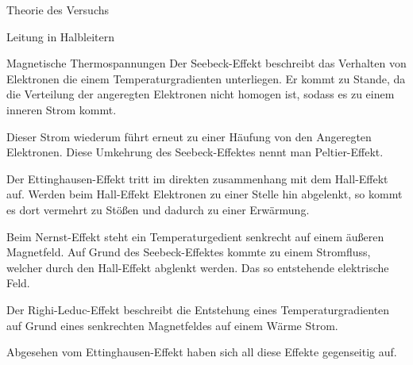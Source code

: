 \documentclass[pdftex, a4paper,11pt, twoside, ngerman]{report}
\begin{document}
\begin{chapter}{Theorie des Versuchs}
\begin{section}{Leitung in Halbleitern}
\begin{subsection}{Magnetische Thermospannungen}
                Der Seebeck-Effekt beschreibt das Verhalten von Elektronen die einem Temperaturgradienten unterliegen. 
                Er kommt zu Stande, da die Verteilung der angeregten Elektronen nicht homogen ist, sodass es zu einem inneren Strom kommt.
                
                Dieser Strom wiederum führt erneut zu einer Häufung von den Angeregten Elektronen.
                Diese Umkehrung des Seebeck-Effektes nennt man Peltier-Effekt.


                Der Ettinghausen-Effekt tritt im direkten zusammenhang mit dem Hall-Effekt auf.
                Werden beim Hall-Effekt Elektronen zu einer Stelle hin abgelenkt, so kommt es dort vermehrt zu Stößen und dadurch zu einer Erwärmung.
                
                Beim Nernst-Effekt steht ein Temperaturgedient senkrecht auf einem äußeren Magnetfeld.
                Auf Grund des Seebeck-Effektes kommte zu einem Stromfluss, welcher durch den Hall-Effekt abglenkt werden.
                Das so entstehende elektrische Feld.


                Der Righi-Leduc-Effekt beschreibt die Entstehung eines Temperaturgradienten auf Grund eines senkrechten Magnetfeldes auf einem Wärme Strom.

                Abgesehen vom Ettinghausen-Effekt haben sich all diese Effekte gegenseitig auf.

        \end{subsection}

    \end{section}
    
    
  \end{chapter}
         
         
         
\end{document}
